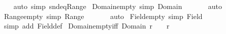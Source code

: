 \begin{isabellebody}
%
\isadelimproof
\ \ %
\endisadelimproof
%
\isatagproof
{}\isamarkupfalse%
\ {\isacharparenleft}{\kern0pt}auto\ simp{\isacharcolon}{\kern0pt}\ snd{\isacharunderscore}{\kern0pt}eq{\isacharunderscore}{\kern0pt}Range{\isacharparenright}{\kern0pt}%
\endisatagproof
{\isafoldproof}%
%
\isadelimproof
\isanewline
%
\endisadelimproof
\isanewline
{}\isamarkupfalse%
\ Domain{\isacharunderscore}{\kern0pt}empty\ {\isacharbrackleft}{\kern0pt}simp{\isacharbrackright}{\kern0pt}{\isacharcolon}{\kern0pt}\ {\isachardoublequoteopen}Domain\ {\isacharbraceleft}{\kern0pt}{\isacharbraceright}{\kern0pt}\ {\isacharequal}{\kern0pt}\ {\isacharbraceleft}{\kern0pt}{\isacharbraceright}{\kern0pt}{\isachardoublequoteclose}\isanewline
%
\isadelimproof
\ \ %
\endisadelimproof
%
\isatagproof
{}\isamarkupfalse%
\ auto%
\endisatagproof
{\isafoldproof}%
%
\isadelimproof
\isanewline
%
\endisadelimproof
\isanewline
{}\isamarkupfalse%
\ Range{\isacharunderscore}{\kern0pt}empty\ {\isacharbrackleft}{\kern0pt}simp{\isacharbrackright}{\kern0pt}{\isacharcolon}{\kern0pt}\ {\isachardoublequoteopen}Range\ {\isacharbraceleft}{\kern0pt}{\isacharbraceright}{\kern0pt}\ {\isacharequal}{\kern0pt}\ {\isacharbraceleft}{\kern0pt}{\isacharbraceright}{\kern0pt}{\isachardoublequoteclose}\isanewline
%
\isadelimproof
\ \ %
\endisadelimproof
%
\isatagproof
{}\isamarkupfalse%
\ auto%
\endisatagproof
{\isafoldproof}%
%
\isadelimproof
\isanewline
%
\endisadelimproof
\isanewline
{}\isamarkupfalse%
\ Field{\isacharunderscore}{\kern0pt}empty\ {\isacharbrackleft}{\kern0pt}simp{\isacharbrackright}{\kern0pt}{\isacharcolon}{\kern0pt}\ {\isachardoublequoteopen}Field\ {\isacharbraceleft}{\kern0pt}{\isacharbraceright}{\kern0pt}\ {\isacharequal}{\kern0pt}\ {\isacharbraceleft}{\kern0pt}{\isacharbraceright}{\kern0pt}{\isachardoublequoteclose}\isanewline
%
\isadelimproof
\ \ %
\endisadelimproof
%
\isatagproof
{}\isamarkupfalse%
\ {\isacharparenleft}{\kern0pt}simp\ add{\isacharcolon}{\kern0pt}\ Field{\isacharunderscore}{\kern0pt}def{\isacharparenright}{\kern0pt}%
\endisatagproof
{\isafoldproof}%
%
\isadelimproof
\isanewline
%
\endisadelimproof
\isanewline
{}\isamarkupfalse%
\ Domain{\isacharunderscore}{\kern0pt}empty{\isacharunderscore}{\kern0pt}iff{\isacharcolon}{\kern0pt}\ {\isachardoublequoteopen}Domain\ r\ {\isacharequal}{\kern0pt}\ {\isacharbraceleft}{\kern0pt}{\isacharbraceright}{\kern0pt}\ {\isasymlongleftrightarrow}\ r\ {\isacharequal}{\kern0pt}\ {\isacharbraceleft}{\kern0pt}{\isacharbraceright}{\kern0pt}{\isachardoublequoteclose}\isanewline

\end{isabellebody}
